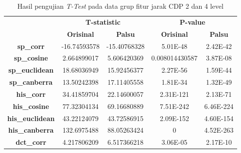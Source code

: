 \begin{table}[!ht]
	\centering
	\caption{Hasil pengujian \emph{T-Test} pada data grup fitur jarak CDP 2 dan 4 level}
	\vspace{0.5em}
	\begin{tabular}{|c|cc|cc|}
		\hline
		\multirow{2}{*}{}       & \multicolumn{2}{c|}{\textbf{T-statistic}} & \multicolumn{2}{c|}{\textbf{P-value}}                                                           \\ \cline{2-5}
		                        & \multicolumn{1}{c|}{\textbf{Orisinal}}    & \textbf{Palsu}                        & \multicolumn{1}{c|}{\textbf{Orisinal}} & \textbf{Palsu} \\ \hline
		\textbf{sp\_corr}       & \multicolumn{1}{c|}{-16.74593578}         & -15.40768328                          & \multicolumn{1}{c|}{5.01E-48}          & 2.42E-42       \\ \hline
		\textbf{sp\_cosine}     & \multicolumn{1}{c|}{2.664899017}          & 5.606420369                           & \multicolumn{1}{c|}{0.008014430587}    & 3.87E-08       \\ \hline
		\textbf{sp\_euclidean}  & \multicolumn{1}{c|}{18.68036949}          & 15.92456377                           & \multicolumn{1}{c|}{2.27E-56}          & 1.59E-44       \\ \hline
		\textbf{sp\_canberra}   & \multicolumn{1}{c|}{13.50242398}          & 17.11405558                           & \multicolumn{1}{c|}{1.81E-34}          & 1.32E-49       \\ \hline
		\textbf{his\_corr}      & \multicolumn{1}{c|}{34.41859704}          & 22.14600057                           & \multicolumn{1}{c|}{2.31E-121}         & 2.13E-71       \\ \hline
		\textbf{his\_cosine}    & \multicolumn{1}{c|}{77.32304134}          & 69.16680889                           & \multicolumn{1}{c|}{7.51E-242}         & 6.46E-224      \\ \hline
		\textbf{his\_euclidean} & \multicolumn{1}{c|}{43.22124079}          & 43.72586915                           & \multicolumn{1}{c|}{2.09E-152}         & 4.60E-154      \\ \hline
		\textbf{his\_canberra}  & \multicolumn{1}{c|}{132.6975488}          & 88.05263424                           & \multicolumn{1}{c|}{0}                 & 4.52E-263      \\ \hline
		\textbf{dct\_corr}      & \multicolumn{1}{c|}{4.217806209}          & 6.517366218                           & \multicolumn{1}{c|}{3.06E-05}          & 2.17E-10       \\ \hline

\end{tabular}
\end{table}
